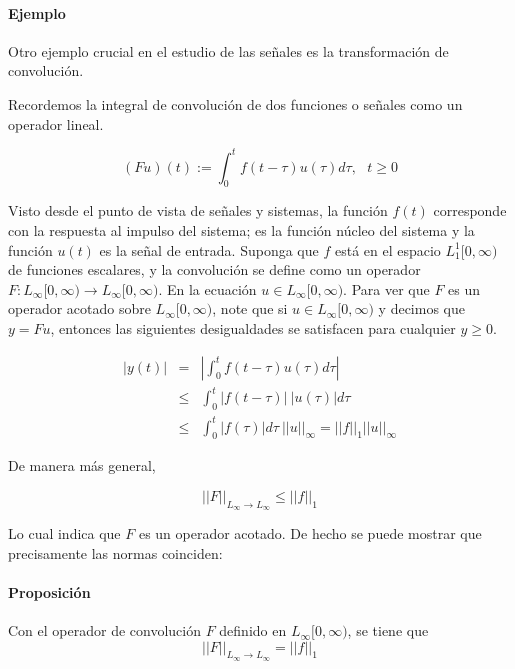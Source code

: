\paragraph{Ejemplo} Otro ejemplo crucial en el estudio de las señales es la transformación de convolución.


Recordemos la integral de convolución de dos funciones o señales como un operador lineal.

\begin{equation*}
    (F u)(t) := \int_{0}^{t} f(t-\tau)u(\tau) d \tau, \ \ \ t\geq 0
\end{equation*}

Visto desde el punto de vista de señales y sistemas, la función $f(t)$ corresponde con la respuesta al impulso del sistema; es la función núcleo del sistema y la función $u(t)$ es la señal de entrada. Suponga que $f$ está en el espacio $L_1^{1}[0,\infty)$ de funciones escalares, y la convolución se define como un operador $F:L_\infty[0,\infty) \to L_\infty[0,\infty)$. En la ecuación $u \in L_\infty[0,\infty)$. Para ver que $F$ es un operador acotado sobre $L_\infty[0,\infty)$, note que si $u \in L_\infty[0,\infty)$ y decimos que $y = F u$, entonces las siguientes desigualdades se satisfacen para cualquier $y \geq 0$.

\begin{eqnarray*}
|y(t)| &=& \left| \int_0^t f(t-\tau)u(\tau)d \tau \right| \\
& \leq & \int_0^t |f(t-\tau)| \ |u(\tau)| d \tau \\
& \leq & \int_0^t |f(\tau)| d \tau \  ||u||_\infty = ||f||_1 ||u||_\infty
\end{eqnarray*}

De manera más general, 

\begin{equation*}
    ||F||_{L_\infty \to L_\infty} \leq ||f||_1
\end{equation*}

Lo cual indica que $F$ es un operador acotado. De hecho se puede mostrar que precisamente las normas coinciden:

\paragraph{Proposición} Con el operador de convolución $F$ definido en $L_\infty[0,\infty)$, se tiene que 
\begin{equation*}
    ||F||_{L_\infty \to L_\infty} = ||f||_1
\end{equation*}

